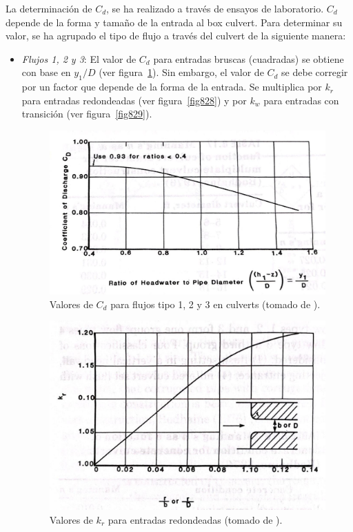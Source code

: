 \documentclass[11pt, oneside]{article}
\begin{document}
La determinaci\'on de $C_d$, se ha realizado a trav\'es de ensayos de laboratorio. $C_d$ depende de la forma y tamaño de la entrada al box culvert. Para determinar su valor, se ha agrupado el tipo de flujo a trav\'es del culvert de la siguiente manera:

\begin{itemize}
    \item \emph{Flujos 1, 2 y 3}: El valor de $C_d$ para entradas bruscas (cuadradas) se obtiene con base en $y_1/D$ (ver figura~\ref{fig827}). Sin embargo, el valor de $C_d$ se debe corregir por un factor que depende de la forma de la entrada. Se multiplica por $k_r$ para entradas redondeadas (ver figura~\ref{fig828}) y por $k_w$ para entradas con transici\'on (ver figura~\ref{fig829}).
\begin{figure}[h]
    \centering
    \includegraphics[width=0.8\linewidth]{fig827.jpeg}
    \caption{Valores de $C_d$ para flujos tipo 1, 2 y 3 en culverts (tomado de \cite{French}).}
    \label{fig827}
\end{figure}
\begin{figure}[h]
    \centering
    \includegraphics[width=0.8\linewidth]{fig828.jpeg}
    \caption{Valores de $k_r$ para entradas redondeadas (tomado de \cite{French}).}

\end{figure}
\end{itemize}
\end{document}
